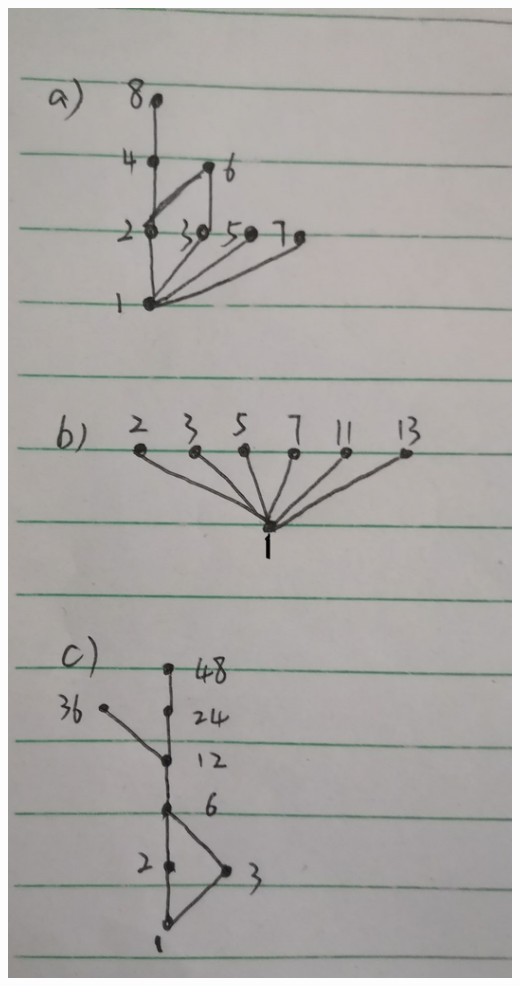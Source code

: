 \documentclass[UTF8]{article}
\begin{document}
\begin{description}
            \includegraphics[scale=0.2]{../imgs/hasse.jpg}




\end{description}
\end{document}
